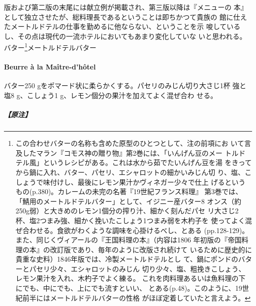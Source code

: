 \begin{recette}
{{{{  版および第二版の末尾には献立例が掲載され、第三版以降は『メニューの
  本』として独立させたが、総料理長であるということは即ちかつて貴族の
  館に仕えたメートルドテルの仕事を勤めるに他ならない、ということを示
  唆しているし、その点は現代の一流ホテルにおいてもあまり変化していな
  いと思われる。}バター\footnote{この合わせバターの名称も含めた原型のひとつとして、注の前項にお
  いて言及したマラン『コモス神の贈り物』第2巻には、「いんげん豆のメー
  トルドテル風」というレシピがある。これは水から茹でたいんげん豆を湯
  をきってから鍋に入れ、バター、パセリ、エシャロットの細かいみじん切
  り、塩、こしょうで味付けし、最後にレモン果汁かヴィネガー少々で仕上
  げるというもの(p.380)。カレームの未完の名著『19世紀フランス料理』
  第3巻では、「鯖用のメートルドテルバター」として、イジニー産バター8
  オンス（約250g弱）と大きめのレモン1個分の搾り汁、細かく刻んだパセ
  リ大さじ2杯、塩2つまみ強、細かく挽いたこしょう1つまみ弱を木杓子を
  使ってよく混ぜ合わせる。食欲がわくような調味を心掛けるべし、とある
  (pp.128-129)。また、同じくヴィアールの『王国料理の本』（内容は1806
  年初版の『帝国料理の本』の改訂版であり、毎年のように改版され続けて
  いるために歴史的に貴重な史料）1846年版では、冷製メートルドテルとし
  て、鍋に\unquart{}ポンドのバターとパセリ少々、エシャロットのみじん
  切り少々、塩、粗挽きこしょう、レモン果汁を入れ、木杓子でよく練る。
  これを肉料理あるいは魚料理の下にでも、中にでも、上にでも流すといい、
  とある(p.48)。このように、19世紀前半にはメートルドテルバターの性格
  がほぼ定着していたと言えよう。}}{メートルドテルバター}}\label{ux30e1ux30fcux30c8ux30ebux30c9ux30c6ux30eb25ux30d0ux30bfux30fc26}}

\hypertarget{beurre-a-la-maitre-d-hotel}{%
\paragraph{Beurre à la
Maître-d'hôtel}\label{beurre-a-la-maitre-d-hotel}}


バター250 gをポマード状に柔らかくする。パセリのみじん切り大さじ1杯
強と塩8 g、こしょう1 g、レモン\unquart{}個分の果汁を加えてよく混ぜ合わ
せる。

\hypertarget{ux539fux6ce8-2}{%
\subparagraph{【原注】}\label{ux539fux6ce8-2}}


\end{recette}

